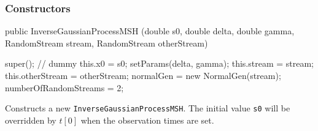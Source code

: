 \subsubsection* {Constructors}
\begin{code}

   public InverseGaussianProcessMSH (double s0, double delta, double gamma,
                                     RandomStream stream, 
                                     RandomStream otherStream) \begin{hide} {
        super(); // dummy
        this.x0 = s0;
        setParams(delta, gamma);
        this.stream = stream;
        this.otherStream = otherStream;
        normalGen = new NormalGen(stream); 
        numberOfRandomStreams = 2;
    }\end{hide}
\end{code}
\begin{tabb} Constructs a new \texttt{InverseGaussianProcessMSH}.
The initial value \texttt{s0} will be overridden by $t[0]$ when
the observation times are set.
\end{tabb}



